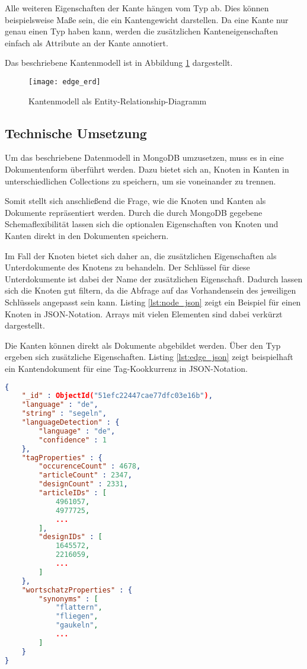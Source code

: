 Alle weiteren Eigenschaften der Kante hängen vom Typ ab. Dies können beispielsweise Maße sein, die ein Kantengewicht darstellen. Da eine Kante nur genau einen Typ haben kann, werden die zusätzlichen Kanteneigenschaften einfach als Attribute an der Kante annotiert.

Das beschriebene Kantenmodell ist in Abbildung \ref{fig:edge_erd} dargestellt.

\begin{figure}
\centering
\texttt{[image: edge\_erd]}
\caption{Kantenmodell als Entity-Relationship-Diagramm}
\label{fig:edge_erd}
\end{figure}

\subsection{Technische Umsetzung}

Um das beschriebene Datenmodell in MongoDB umzusetzen, muss es in eine Dokumentenform überführt werden. Dazu bietet sich an, Knoten in Kanten in unterschiedlichen Collections zu speichern, um sie voneinander zu trennen.

Somit stellt sich anschließend die Frage, wie die Knoten und Kanten als Dokumente repräsentiert werden. Durch die durch MongoDB gegebene Schemaflexibilität lassen sich die optionalen Eigenschaften von Knoten und Kanten direkt in den Dokumenten speichern.

Im Fall der Knoten bietet sich daher an, die zusätzlichen Eigenschaften als Unterdokumente des Knotens zu behandeln. Der Schlüssel für diese Unterdokumente ist dabei der Name der zusätzlichen Eigenschaft. Dadurch lassen sich die Knoten gut filtern, da die Abfrage auf das Vorhandensein des jeweiligen Schlüssels angepasst sein kann. Listing \ref{lst:node_json} zeigt ein Beispiel für einen Knoten in JSON-Notation. Arrays mit vielen Elementen sind dabei verkürzt dargestellt.

Die Kanten können direkt als Dokumente abgebildet werden. Über den Typ ergeben sich zusätzliche Eigenschaften. Listing \ref{lst:edge_json} zeigt beispielhaft ein Kantendokument für eine Tag-Kookkurrenz in JSON-Notation.

\begin{lstlisting}[language=json, label={lst:node_json}, caption={Knotendokument in JSON}]
{
    "_id" : ObjectId("51efc22447cae77dfc03e16b"),
    "language" : "de",
    "string" : "segeln",
    "languageDetection" : {
        "language" : "de",
        "confidence" : 1
    },
    "tagProperties" : {
        "occurenceCount" : 4678,
        "articleCount" : 2347,
        "designCount" : 2331,
        "articleIDs" : [ 
            4961057, 
            4977725, 
            ...
        ],
        "designIDs" : [ 
            1645572, 
            2216059, 
            ...
        ]
    },
    "wortschatzProperties" : {
        "synonyms" : [ 
            "flattern", 
            "fliegen", 
            "gaukeln", 
            ...
        ]
    }
}
\end{lstlisting}

